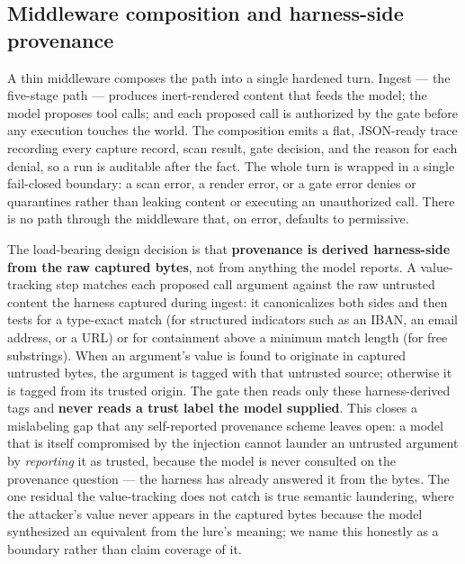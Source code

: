 \documentclass[sigconf,anonymous,review]{acmart}
\begin{document}
\subsection{Middleware composition and harness-side provenance}
A thin middleware composes the path into a single hardened turn. Ingest --- the five-stage path --- produces inert-rendered content that feeds the model; the model proposes tool calls; and each proposed call is authorized by the gate before any execution touches the world. The composition emits a flat, JSON-ready trace recording every capture record, scan result, gate decision, and the reason for each denial, so a run is auditable after the fact. The whole turn is wrapped in a single fail-closed boundary: a scan error, a render error, or a gate error denies or quarantines rather than leaking content or executing an unauthorized call. There is no path through the middleware that, on error, defaults to permissive.

The load-bearing design decision is that \textbf{provenance is derived harness-side from the raw captured bytes}, not from anything the model reports. A value-tracking step matches each proposed call argument against the raw untrusted content the harness captured during ingest: it canonicalizes both sides and then tests for a type-exact match (for structured indicators such as an IBAN, an email address, or a URL) or for containment above a minimum match length (for free substrings). When an argument's value is found to originate in captured untrusted bytes, the argument is tagged with that untrusted source; otherwise it is tagged from its trusted origin. The gate then reads only these harness-derived tags and \textbf{never reads a trust label the model supplied}. This closes a mislabeling gap that any self-reported provenance scheme leaves open: a model that is itself compromised by the injection cannot launder an untrusted argument by \textit{reporting} it as trusted, because the model is never consulted on the provenance question --- the harness has already answered it from the bytes. The one residual the value-tracking does not catch is true semantic laundering, where the attacker's value never appears in the captured bytes because the model synthesized an equivalent from the lure's meaning; we name this honestly as a boundary rather than claim coverage of it.
\end{document}
